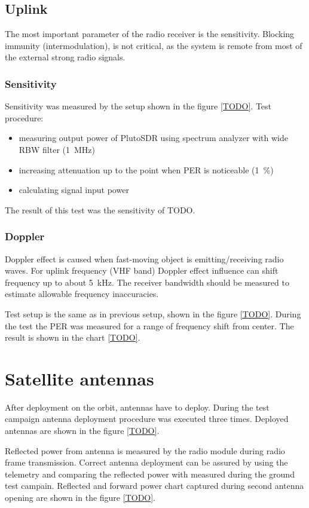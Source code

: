 \subsection{Uplink}
The most important parameter of the radio receiver is the sensitivity. Blocking immunity (intermodulation), is not critical, as the system is remote from most of the external strong radio signals.

\subsubsection{Sensitivity}
Sensitivity was measured by the setup shown in the figure \ref{TODO}. Test procedure:
\begin{itemize}
    \item measuring output power of PlutoSDR using spectrum analyzer with wide RBW filter (\SI{1}{\MHz})
    \item increasing attenuation up to the point when PER is noticeable (\SI{1}{\percent})
    \item calculating signal input power
\end{itemize}

The result of this test was the sensitivity of TODO.

\subsubsection{Doppler}
Doppler effect is caused when fast-moving object is emitting/receiving radio waves. For uplink frequency (VHF band) Doppler effect influence can shift frequency up to about \SI{5}{\kHz}. The receiver bandwidth should be measured to estimate allowable frequency inaccuracies.

Test setup is the same as in previous setup, shown in the figure \ref{TODO}. During the test the PER was measured for a range of frequency shift from center. The result is shown in the chart \ref{TODO}.

\section{Satellite antennas}
After deployment on the orbit, antennas have to deploy. During the test campaign antenna deployment procedure was executed three times. Deployed antennas are shown in the figure \ref{TODO}.

Reflected power from antenna is measured by the radio module during radio frame transmission. Correct antenna deployment can be assured by using the telemetry and comparing the reflected power with measured during the ground test campain. 
Reflected and forward power chart captured during second antenna opening are shown in the figure \ref{TODO}. 



